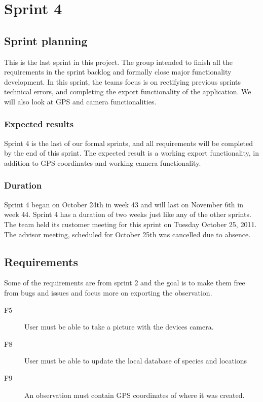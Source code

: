 \section{Sprint 4}

\subsection{Sprint planning}

This is the last sprint in this project. The group intended to finish all the
requirements in the sprint backlog and formally close major functionality
development. 
In this sprint, the teams focus is on rectifying previous sprints technical
errors, and completing the export functionality of the application. We will also
look at GPS and camera functionalities.

\subsubsection{Expected results}
Sprint 4 is the last of our formal sprints, and all requirements will be
completed by the end of this sprint. The expected result is a working export
functionality, in addition to GPS coordinates and working camera functionality.

\subsubsection{Duration}
Sprint 4 began on October 24th in week 43 and will last on November 6th in week
44. Sprint 4 has a duration of two weeks just like any of the other sprints.
The team held its customer meeting for this sprint on Tuesday October 25, 2011.
The advisor meeting, scheduled for October 25th was cancelled due to absence. 

\subsection{Requirements}
Some of the requirements are from sprint 2 and the goal is to make them free
from bugs and issues and focus more on exporting the observation.

\begin{description}
	\item[F5] User must be able to take a picture with the devices camera.
	\item[F8] User must be able to update the local database of species and locations
	\item[F9] An observation must contain GPS coordinates of where it was created.
\end{description}

